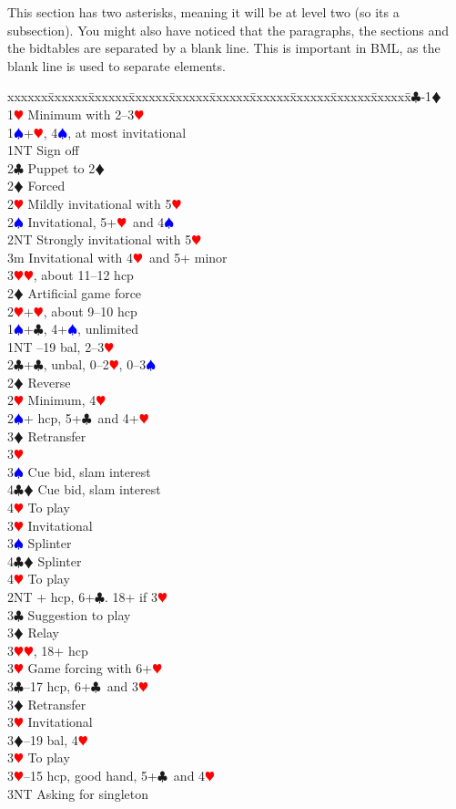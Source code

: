 \documentclass[a4paper]{article}
\newcommand{\BC}{\textcolor{OliveGreen}{$\clubsuit$}}
\newcommand{\BD}{\textcolor{RedOrange}{$\vardiamondsuit$}}
\newcommand{\BH}{\textcolor{Red}{$\varheartsuit${}}}
\newcommand{\BS}{\textcolor{Blue}{$\spadesuit${}}}
\newenvironment{bidtable}
{\begin{tabbing}

xxxxxx\=xxxxxx\=xxxxxx\=xxxxxx\=xxxxxx\=xxxxxx\=xxxxxx\=xxxxxx\=xxxxxx\=xxxxxx\=\kill}
{\end{tabbing} }%
\begin{document}
This section has two asterisks, meaning it will be at level two
(so its a subsection). You might also have noticed that the
paragraphs, the sections and the bidtables are separated by a
blank line. This is important in BML, as the blank line is used to
separate elements.
\bigbreak
\begin{bidtable}
1\BC-1\BD\+\\
1\BH \> Minimum with 2--3\BH \+\\
1\BS {}+\BH , 4\BS , at most invitational\\
1NT \> Sign off\\
2\BC \> Puppet to 2\BD \+\\
2\BD \> Forced\+\\
2\BH \> Mildly invitational with 5\BH \\
2\BS \> Invitational, 5+\BH\ and 4\BS \\
2NT \> Strongly invitational with 5\BH \\
3m \> Invitational with 4\BH\ and 5+ minor\\
3\BH {}\BH , about 11--12 hcp\-\-\\
2\BD \> Artificial game force\\
2\BH {}+\BH , about 9--10 hcp\-\\
1\BS {}+\BC , 4+\BS , unlimited\\
1NT --19 bal, 2--3\BH \\
2\BC {}+\BC , unbal, 0--2\BH , 0--3\BS \\
2\BD \> Reverse\\
2\BH \> Minimum, 4\BH \\
2\BS {}+ hcp, 5+\BC\ and 4+\BH \+\\
3\BD \> Retransfer\+\\
3\BH\+\\
3\BS \> Cue bid, slam interest\\
4\BC\BD \> Cue bid, slam interest\\
4\BH \> To play\-\-\\
3\BH \> Invitational\\
3\BS \> Splinter\\
4\BC\BD \> Splinter\\
4\BH \> To play\-\\
2NT + hcp, 6+\BC . 18+ if 3\BH \+\\
3\BC \> Suggestion to play\\
3\BD \> Relay\+\\
3\BH {}\BH , 18+ hcp\-\\
3\BH \> Game forcing with 6+\BH \-\\
3\BC {}--17 hcp, 6+\BC\ and 3\BH \+\\
3\BD \> Retransfer\\
3\BH \> Invitational\-\\
3\BD {}--19 bal, 4\BH \+\\
3\BH \> To play\-\\
3\BH {}--15 hcp, good hand, 5+\BC\ and 4\BH \+\\
3NT \> Asking for singleton\-\-
\end{bidtable}
\end{document}
